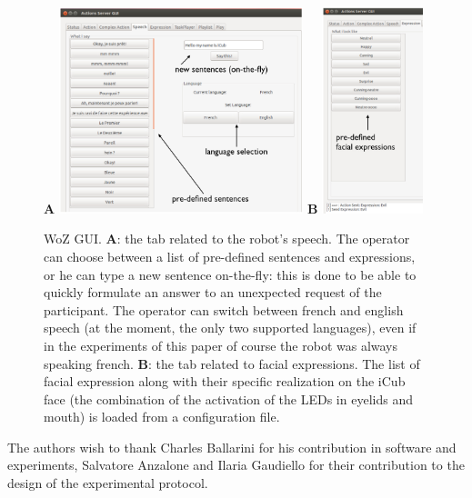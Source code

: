 \documentclass[twocolumn]{svjour3}          %
\begin{document}
\begin{figure}
\centering
{\large \textbf{\textsf{A}}} \includegraphics[height=6cm]{figures/gui_speech.jpg} \hspace{0.5cm}
{\large \textbf{\textsf{B}}}  \includegraphics[height=6cm]{figures/gui_faceexpressions.jpg}
\caption{WoZ GUI. \textbf{\textsf{A}}: the tab related to the robot's speech. The operator can choose between a list of pre-defined sentences and expressions, or he can type a new sentence on-the-fly: this is done to be able to quickly formulate an answer to an unexpected request of the participant. The operator can switch between french and english speech (at the moment, the only two supported languages), even if in the experiments of this paper of course the robot was always speaking french. \textbf{\textsf{B}}: the tab related to facial expressions. The list of facial expression along with their specific realization on the iCub face (the combination of the activation of the LEDs in eyelids and mouth) is loaded from a configuration file.}
\label{fig:guispeech}
\end{figure}



\begin{acknowledgements}
The authors wish to thank Charles Ballarini for his contribution in software and experiments, Salvatore Anzalone and Ilaria Gaudiello for their contribution to the design of the experimental protocol.
\end{acknowledgements}

\end{document}
